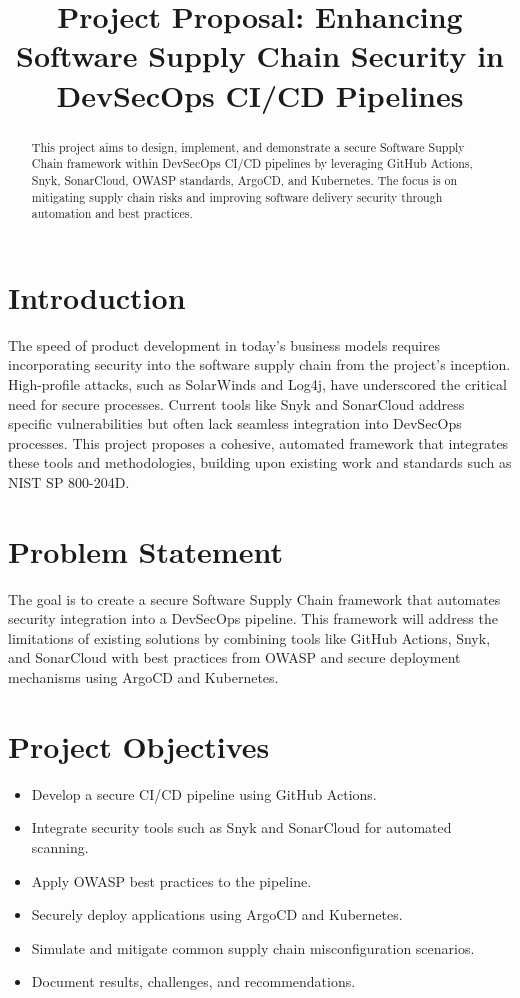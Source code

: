 \documentclass[conference]{IEEEtran}
\title{Project Proposal: Enhancing Software Supply Chain Security in DevSecOps CI/CD Pipelines}
\author{
    \IEEEauthorblockN{Marlon Brenes R}
    \IEEEauthorblockA{
        Student ID: 1314316 \\
        Master's in Cybersecurity \\
        \href{mailto:marlon.brenes@nyit.edu}{marlon.brenes@nyit.edu}
    }
}
\date{}
\begin{document}
\maketitle

\begin{abstract}
This project aims to design, implement, and demonstrate a secure Software Supply Chain framework within DevSecOps CI/CD pipelines by leveraging GitHub Actions, Snyk, SonarCloud, OWASP standards, ArgoCD, and Kubernetes. The focus is on mitigating supply chain risks and improving software delivery security through automation and best practices.
\end{abstract}

\section{Introduction}
The speed of product development in today's business models requires incorporating security into the software supply chain from the project's inception. High-profile attacks, such as SolarWinds and Log4j, have underscored the critical need for secure processes. Current tools like Snyk and SonarCloud address specific vulnerabilities but often lack seamless integration into DevSecOps processes. This project proposes a cohesive, automated framework that integrates these tools and methodologies, building upon existing work and standards such as NIST SP 800-204D.

\section{Problem Statement}
The goal is to create a secure Software Supply Chain framework that automates security integration into a DevSecOps pipeline. This framework will address the limitations of existing solutions by combining tools like GitHub Actions, Snyk, and SonarCloud with best practices from OWASP and secure deployment mechanisms using ArgoCD and Kubernetes.

\section{Project Objectives}
\begin{itemize}
    \item Develop a secure CI/CD pipeline using GitHub Actions.
    \item Integrate security tools such as Snyk and SonarCloud for automated scanning.
    \item Apply OWASP best practices to the pipeline.
    \item Securely deploy applications using ArgoCD and Kubernetes.
    \item Simulate and mitigate common supply chain misconfiguration scenarios.
    \item Document results, challenges, and recommendations.
\end{itemize}
\end{document}
